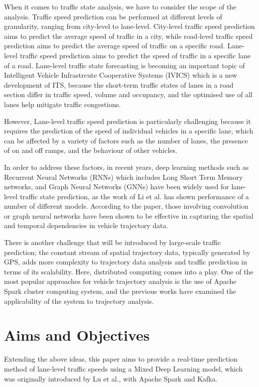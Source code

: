 \documentclass[11pt]{uonthesis}
\begin{document}
When it comes to traffic state analysis, we have to consider the scope of the analysis. Traffic speed prediction can be performed at different levels of granularity, ranging from city-level to lane-level. City-level traffic speed prediction aims to predict the average speed of traffic in a city, while road-level traffic speed prediction aims to predict the average speed of traffic on a specific road. Lane-level traffic speed prediction aims to predict the speed of traffic in a specific lane of a road. Lane-level traffic state forecasting is becoming an important topic of Intelligent Vehicle Infrastrcute Cooperative Systems (IVICS) which is a new development of ITS, because the short-term traffic states of lanes in a road section differ in traffic speed, volume and occupancy\cite{GU20191}, and the optimised use of all lanes help mitigate traffic congestions. 

However, Lane-level traffic speed prediction is particularly challenging because it requires the prediction of the speed of individual vehicles in a specific lane, which can be affected by a variety of factors such as the number of lanes, the presence of on and off ramps, and the behaviour of other vehicles.

In order to address these factors, in recent years, deep learning methods such as Recurrent Neural Networks (RNNs) which includes Long Short Term Memory networks, and Graph Neural Networks (GNNs) have been widely used for lane-level traffic state prediction, as the work of Li et al.\cite{li2024unifyinglaneleveltrafficprediction} has shown performance of a number of different models. According to the paper, those involving convolution or graph neural networks have been shown to be effective in capturing the spatial and temporal dependencies in vehicle trajectory data.

There is another challenge that will be introduced by large-scale traffic prediction; the constant stream of spatial trajectory data, typically generated by GPS, adds more complexity to trajectory data analysis and traffic prediction in terms of its scalability. Here, distributed computing comes into a play. One of the most popular approaches for vehicle trajectory analysis is the use of Apache Spark cluster computing system, and the previous works\cite{9077707}\cite{Sigurdsson2018RoadTC} have examined the applicability of the system to trajectory analysis.

\section{Aims and Objectives}
Extending the above ideas, this paper aims to provide a real-time prediction method of lane-level traffic speeds using a Mixed Deep Learning model, which was originally introduced by Lu et al.\cite{9284587}, with Apache Spark and Kafka. 
\end{document}
